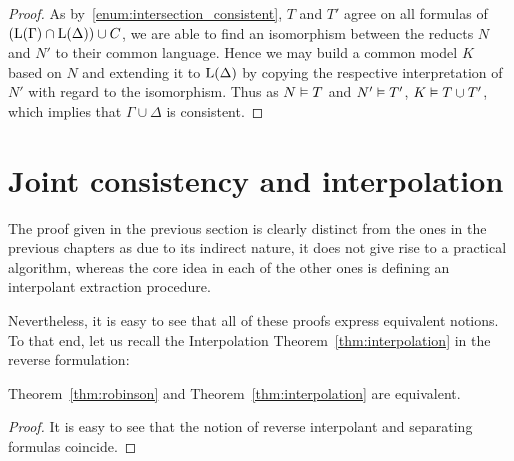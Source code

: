 \begin{proof}
	As by~\ref{enum:intersection_consistent}, $T$ and $T'$ agree on all formulas of $(\operatorname{L}(\Gamma) \cap \operatorname{L}(\Delta))\cup C$, 
	we are able to find an isomorphism between the reducts $N$ and $N'$ to their common language.
	Hence we may build a common model $K$ based on $N$ and extending it to $\operatorname{L}(\Delta)$ by copying the respective interpretation of $N'$ with regard to the isomorphism.
	Thus as $N\vDash T$ and $N'\vDash T'$, $K\vDash T \cup T'$, which implies that $\Gamma\cup\Delta$ is consistent.
\end{proof}

\section{Joint consistency and interpolation}

The proof given in the previous section is clearly distinct from the ones in the previous chapters as due to its indirect nature, it does not give rise to a practical algorithm, 
whereas the core idea in each of the other ones is defining an interpolant extraction procedure.


Nevertheless, 
it is easy to see that all of these proofs express equivalent notions.
To that end, let us recall the Interpolation Theorem~\ref{thm:interpolation} in the reverse formulation:

\interpolationRevThm*

\begin{prop}
	Theorem~\ref{thm:robinson} and Theorem~\ref{thm:interpolation} are equivalent.
\end{prop}
\begin{proof}
	It is easy to see that the notion of reverse interpolant and separating formulas coincide.
\end{proof}





